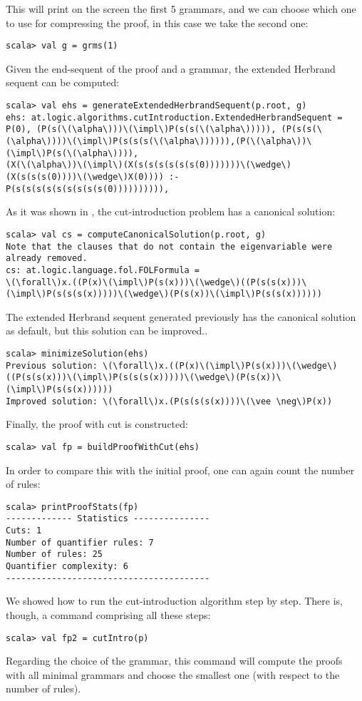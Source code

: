 \documentclass[a4paper,11pt]{article}
\newcommand{\impl}{\supset} %
\begin{document}
This will print on the screen the first 5 grammars, and we can choose which one
to use for compressing the proof, in this case we take the second one:
\begin{lstlisting}
scala> val g = grms(1)
\end{lstlisting}
Given the end-sequent of the proof and a grammar, the extended Herbrand sequent can be computed:
\begin{lstlisting}
scala> val ehs = generateExtendedHerbrandSequent(p.root, g)
ehs: at.logic.algorithms.cutIntroduction.ExtendedHerbrandSequent = 
P(0), (P(s(\(\alpha\)))\(\impl\)P(s(s(\(\alpha\))))), (P(s(s(\(\alpha\))))\(\impl\)P(s(s(s(\(\alpha\)))))),(P(\(\alpha\))\(\impl\)P(s(\(\alpha\)))),
(X(\(\alpha\))\(\impl\)(X(s(s(s(s(s(s(0)))))))\(\wedge\)(X(s(s(s(0))))\(\wedge\)X(0)))) :- 
P(s(s(s(s(s(s(s(s(s(0)))))))))),
\end{lstlisting}
As it was shown in \cite{HetzlXXAlgorithmic}, the cut-introduction problem has a
canonical solution:
\begin{lstlisting}
scala> val cs = computeCanonicalSolution(p.root, g)
Note that the clauses that do not contain the eigenvariable were already removed.
cs: at.logic.language.fol.FOLFormula = 
\(\forall\)x.((P(x)\(\impl\)P(s(x)))\(\wedge\)((P(s(s(x)))\(\impl\)P(s(s(s(x)))))\(\wedge\)(P(s(x))\(\impl\)P(s(s(x))))))
\end{lstlisting}
The extended Herbrand sequent generated previously has the canonical solution as
default, but this solution can be improved.. 
\begin{lstlisting}
scala> minimizeSolution(ehs)
Previous solution: \(\forall\)x.((P(x)\(\impl\)P(s(x)))\(\wedge\)((P(s(s(x)))\(\impl\)P(s(s(s(x)))))\(\wedge\)(P(s(x))\(\impl\)P(s(s(x))))))
Improved solution: \(\forall\)x.(P(s(s(s(x))))\(\vee \neg\)P(x))
\end{lstlisting}
Finally, the proof with cut is constructed:
\begin{lstlisting}
scala> val fp = buildProofWithCut(ehs)
\end{lstlisting}
In order to compare this with the initial proof, one can again count
the number of rules:
\begin{lstlisting}
scala> printProofStats(fp)
------------- Statistics ---------------
Cuts: 1
Number of quantifier rules: 7
Number of rules: 25
Quantifier complexity: 6
----------------------------------------
\end{lstlisting}
We showed how to run the cut-introduction algorithm step by step. There is,
though, a command comprising all these steps:
\begin{lstlisting}
scala> val fp2 = cutIntro(p)
\end{lstlisting}
Regarding the choice of the grammar, this command will compute the proofs with
all minimal grammars and choose the smallest one (with respect to the number of rules).
\end{document}
